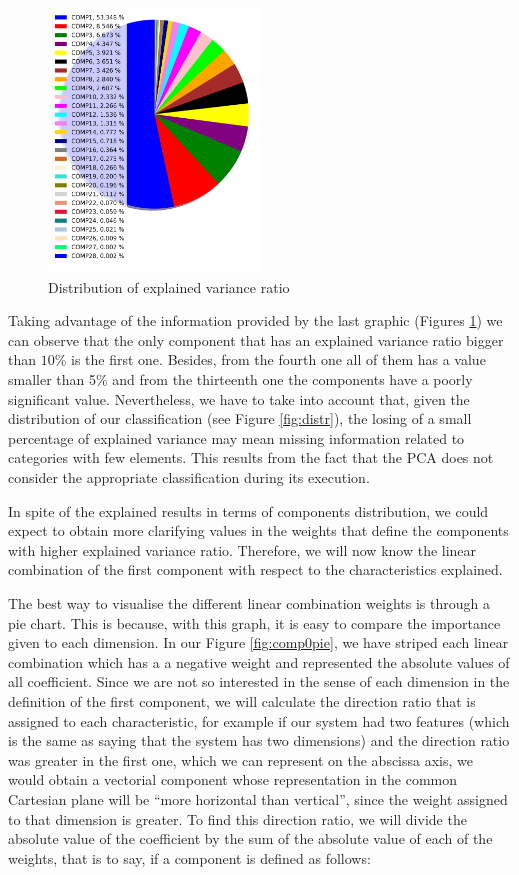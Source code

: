 \begin{figure}
	\centering%
	\centerline{\includegraphics[width=0.5\textwidth]{Imagenes/Bitmap/PCA/expvarpie.png}}%
	\caption{Distribution of explained variance ratio}%
	\label{fig:expvarpie}
\end{figure}

Taking advantage of the information provided by the last graphic (Figures \ref{fig:expvarpie}) we can observe that the only component that has an explained variance ratio bigger than $10$\% is the first one. Besides, from the fourth one all of them has a value smaller than 5\% and from the thirteenth one the components have a poorly significant value. Nevertheless, we have to take into account that, given the distribution of our classification (see Figure \ref{fig:distr}), the losing of a small percentage of explained variance may mean missing information related to categories with few elements. This results from the fact that the PCA does not consider the appropriate classification during its execution.

In spite of the explained results in terms of components distribution, we could expect to obtain more clarifying values in the weights that define the components with higher explained variance ratio. Therefore, we will now know the linear combination of the first component with respect to the characteristics explained.

The best way to visualise the different linear combination weights is through a pie chart. This is because, with this graph, it is easy to compare the importance given to each dimension. In our Figure \ref{fig:comp0pie}, we have striped each linear combination which has a a negative weight and represented the absolute values of all coefficient. Since we are not so interested in the sense of each dimension in the definition of the first component, we will calculate the direction ratio that is assigned to each characteristic, for example if our system had two features (which is the same as saying that the system has two dimensions) and the direction ratio was greater in the first one, which we can represent on the abscissa axis, we would obtain a vectorial component whose representation in the common Cartesian plane will be ``more horizontal than vertical'', since the weight assigned to that dimension is greater. To find this direction ratio, we will divide the absolute value of the coefficient by the sum of the absolute value of each of the weights, that is to say, if a component is defined as follows:

